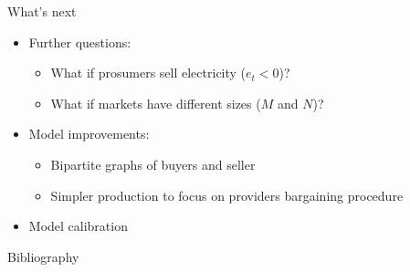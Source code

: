 \documentclass{beamer}
\begin{document}
\begin{frame}{What's next}
    \begin{itemize} \setlength\itemsep{1.5em}
        \item Further questions: \pause
              \begin{itemize} \setlength\itemsep{1em}
                  \item What if prosumers sell electricity ($e_t < 0$)? \pause
                  \item What if markets have different sizes ($M$ and $N$)? \pause
              \end{itemize}
        \item Model improvements: \pause
              \begin{itemize} \setlength\itemsep{1em}
                  \item Bipartite graphs of buyers and seller \pause
                  \item Simpler production to focus on providers bargaining procedure \pause
              \end{itemize}
        \item Model calibration
    \end{itemize}
\end{frame}


\begin{frame}[allowframebreaks]{Bibliography}
    \printbibliography
\end{frame}
\end{document}
